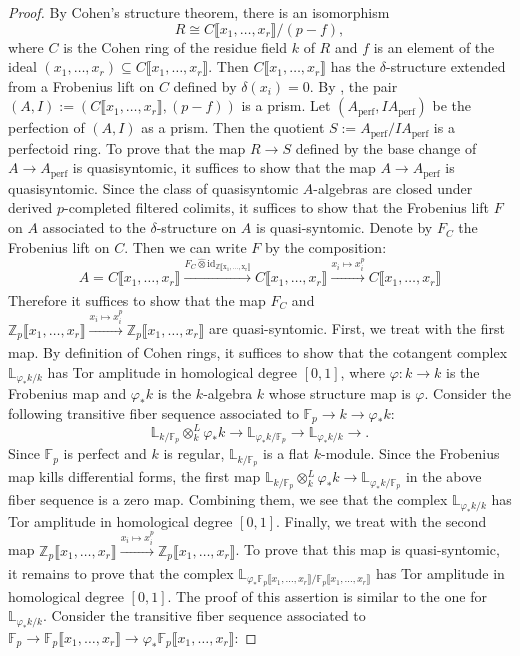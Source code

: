 \documentclass[11pt, a4paper]{amsart}
\theoremstyle{plain}
\theoremstyle{definition}
\begin{document}
\begin{proof}
    By Cohen's structure theorem, there is an isomorphism\[R\cong C\llbracket x_1,\dots,x_r\rrbracket/(p-f),\] where $C$ is the Cohen ring of the residue field $k$ of $R$ and $f$ is an element of the ideal $(x_1,\dots,x_r)\subseteq C\llbracket x_1,\dots,x_r\rrbracket$. Then $C\llbracket x_1,\dots,x_r\rrbracket$ has the $\delta$-structure extended from a Frobenius lift on $C$ defined by $\delta(x_i)=0$. By \cite[Example 5.2]{IN26}, the pair $(A,I):=(C\llbracket x_1,\dots,x_r\rrbracket,(p-f))$ is a prism. Let $(A_{\mathrm{perf}},IA_{\mathrm{perf}})$ be the perfection of $(A,I)$ as a prism. Then the quotient $S:=A_{\mathrm {perf}}/IA_{\mathrm{perf}}$ is a perfectoid ring. To prove that the map $R\to S$ defined by the base change of $A\to A_{\mathrm{perf}}$ is quasisyntomic, it suffices to show that the map $A\to A_{\mathrm{perf}}$ is quasisyntomic. Since the class of quasisyntomic $A$-algebras are closed under derived $p$-completed filtered colimits, it suffices to show that the Frobenius lift $F$ on $A$ associated to the $\delta$-structure on $A$ is quasi-syntomic.  Denote by $F_C$ the Frobenius lift on $C$. Then we can write $F$ by the composition:\[A=C\llbracket x_1,\dots,x_r\rrbracket\xrightarrow[]{F_C\widehat \otimes\mathrm{id_{\mathbb Z\llbracket x_1,\dots,x_r\rrbracket}}}C\llbracket x_1,\dots,x_r\rrbracket\xrightarrow[]{x_i\mapsto x_i^p}C\llbracket x_1,\dots,x_r\rrbracket\]
    Therefore it suffices to show that the map $F_C$ and $\mathbb Z_p\llbracket x_1,\dots,x_r\rrbracket\xrightarrow[]{x_i\mapsto x_i^p}\mathbb Z_p\llbracket x_1,\dots,x_r\rrbracket$ are quasi-syntomic. First, we treat with the first map. By definition of Cohen rings, it suffices to show that the cotangent complex $\mathbb L_{\varphi_*k/k}$ has Tor amplitude in homological degree $[0,1]$, where $\varphi:k\to k$ is the Frobenius map and $\varphi_*k$ is the $k$-algebra $k$ whose structure map is $\varphi$. Consider the following transitive fiber sequence associated to $\mathbb F_p\to k\to \varphi_*k$:
    \[\mathbb L_{k/\mathbb F_p}\otimes_k^L\varphi_*k\to \mathbb L_{\varphi_*k/\mathbb F_p}\to \mathbb L_{\varphi_*k/k}\to .\] Since $\mathbb F_p$ is perfect and $k$ is regular, $\mathbb L_{k/\mathbb F_p}$ is a flat $k$-module. Since the Frobenius map kills differential forms, the first map $\mathbb L_{k/\mathbb F_p}\otimes_k^L\varphi_*k\to \mathbb L_{\varphi_*k/\mathbb F_p}$ in the above fiber sequence is a zero map. Combining them, we see that the complex $\mathbb L_{\varphi_*k/k}$ has Tor amplitude in homological degree $[0,1]$. Finally, we treat with the second map $\mathbb Z_p\llbracket x_1,\dots,x_r\rrbracket\xrightarrow[]{x_i\mapsto x_i^p}\mathbb Z_p\llbracket x_1,\dots,x_r\rrbracket$. To prove that this map is quasi-syntomic, it remains to prove that the complex $\mathbb L_{\varphi_*\mathbb F_p\llbracket x_1,\dots,x_r\rrbracket/\mathbb F_p\llbracket x_1,\dots,x_r\rrbracket}$ has Tor amplitude in homological degree $[0,1]$. The proof of this assertion is similar to the one for $\mathbb L_{\varphi_*k/k}$. Consider the transitive fiber sequence associated to $\mathbb F_p\to \mathbb F_p\llbracket x_1,\dots,x_r\rrbracket\to \varphi_*\mathbb F_p\llbracket x_1,\dots,x_r\rrbracket$:

\end{proof}
\end{document}
